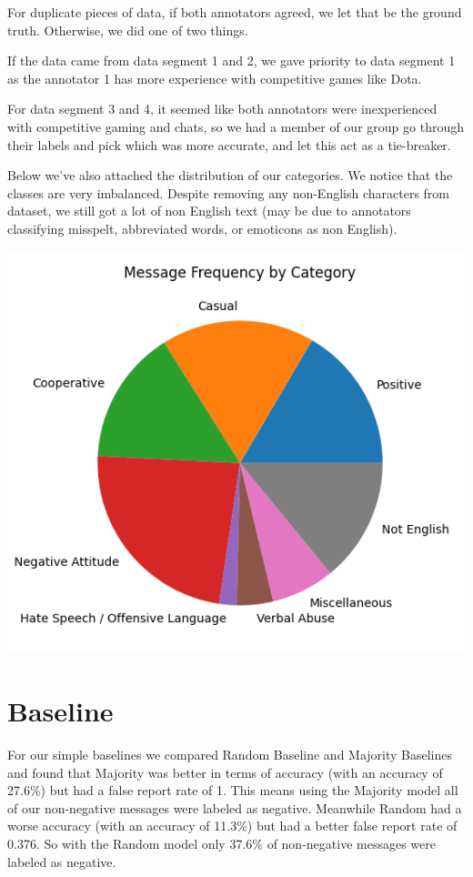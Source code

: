 \documentclass[11pt, letterpaper, notitlepage]{article}
\begin{document}
For duplicate pieces of data, if both annotators agreed, we let that be the ground truth. Otherwise, we did one of two things.

If the data came from data segment 1 and 2, we gave priority to data segment 1 as the annotator 1 has more experience with competitive games like Dota.

For data segment 3 and 4, it seemed like both annotators were inexperienced with competitive gaming and chats, so we had a member of our group go through their labels and pick which was more accurate, and let this act as a tie-breaker.

Below we've also attached the distribution of our categories. We notice that the classes are very imbalanced. Despite removing any non-English characters from dataset, we still got a lot of non English text (may be due to annotators classifying misspelt, abbreviated words, or emoticons as non English).

\includegraphics[scale=0.8]{frequency_plot}

\section[3]{Baseline}

For our simple baselines we compared Random Baseline and Majority Baselines and found that Majority was better in terms of accuracy (with an accuracy of 27.6\%) but had a false report rate of 1. This means using the Majority model all of our non-negative messages were labeled as negative. Meanwhile Random had a worse accuracy (with an accuracy of 11.3\%) but had a better false report rate of 0.376. So with the Random model only 37.6\% of non-negative messages were labeled as negative.
\end{document}
